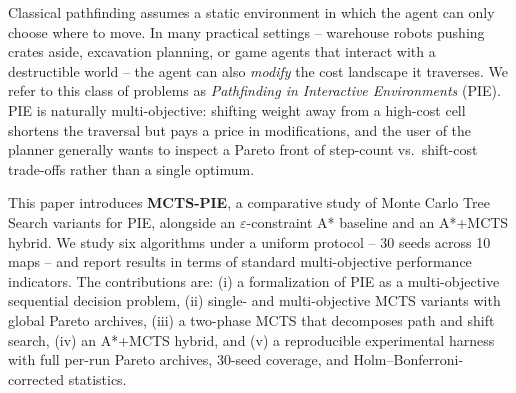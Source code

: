 Classical pathfinding assumes a static environment in which the agent can only choose where to move. In many practical settings -- warehouse robots pushing crates aside, excavation planning, or game agents that interact with a destructible world -- the agent can also \emph{modify} the cost landscape it traverses. We refer to this class of problems as \emph{Pathfinding in Interactive Environments} (PIE). PIE is naturally multi-objective: shifting weight away from a high-cost cell shortens the traversal but pays a price in modifications, and the user of the planner generally wants to inspect a Pareto front of step-count vs.\ shift-cost trade-offs rather than a single optimum.

This paper introduces \textbf{MCTS-PIE}, a comparative study of Monte Carlo Tree Search variants for PIE, alongside an $\varepsilon$-constraint A* baseline and an A*+MCTS hybrid. We study six algorithms under a uniform protocol -- 30 seeds across 10 maps -- and report results in terms of standard multi-objective performance indicators. The contributions are: (i) a formalization of PIE as a multi-objective sequential decision problem, (ii) single- and multi-objective MCTS variants with global Pareto archives, (iii) a two-phase MCTS that decomposes path and shift search, (iv) an A*+MCTS hybrid, and (v) a reproducible experimental harness with full per-run Pareto archives, 30-seed coverage, and Holm--Bonferroni-corrected statistics.
